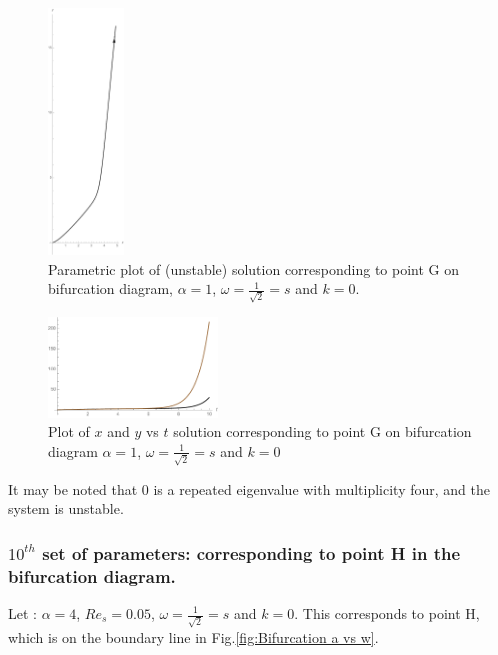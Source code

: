 \documentclass[pdflatex,sn-mathphys]{sn-jnl}%
\theoremstyle{thmstyleone}%
\theoremstyle{thmstyletwo}%
\theoremstyle{thmstylethree}%
\begin{document}
  \begin{figure}
  \centering
    \includegraphics[width=0.18\textwidth]{ais1wisroot2Para}
    \caption{Parametric plot of (unstable) solution corresponding to point G on bifurcation diagram, $\alpha = 1$, $\omega=\frac{1}{\sqrt{2}}=s$ and $k=0$.}
    \label{fig: Unstable parametric Point G}   
\end{figure}
\begin{figure}[h]%
\centering
 \includegraphics[width=0.4\textwidth]{ais1wisroot2Plot}
    \caption{Plot of $x$ and $y$ vs $t$ solution corresponding to point G on bifurcation diagram $\alpha = 1$, $\omega=\frac{1}{\sqrt{2}}=s$ and $k=0$}
    \label{fig: Unstable  Point G}
\end{figure}


It may be noted that $0$ is a repeated eigenvalue with multiplicity four, and the system is unstable.

\subsubsection{$10^{th}$ set of parameters: corresponding to point H in the bifurcation diagram.}\label{$10^{th}$ set}
Let : $\alpha = 4$, $Re_{s}=0.05$, $\omega=\frac{1}{\sqrt{2}}=s$ and $k=0$. This corresponds to point H, which is on the boundary line in Fig.\ref{fig:Bifurcation a vs w}.
\end{document}
